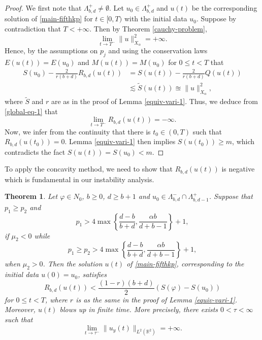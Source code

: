 \documentclass[10pt]{article}
\numberwithin{equation}{section}
\newtheorem{theorem}{\quad Theorem}[section]
\newcommand{\ff}{\varphi}
\newcommand{\x}{{X_\alpha}}
\newcommand{\moo}{\mu_2}  \newcommand{\poo}{{p_2}}
\newcommand{\al}{\alpha}
\newcommand{\rr}{\mathbb{R}}
\newcommand{\rrr}{{R_{b,d}}}
\begin{document}
	\begin{proof}
		We first note that $\Lambda_{b,d}^+\neq\emptyset$. Let $u_0\in \Lambda_{b,d}^+$ and $u(t)$ be the corresponding solution of \eqref{main-fifthkp} for $t\in[0,T)$ with the initial data $u_0$. Suppose by contradiction that $T<+\infty$. Then by Theorem \ref{cauchy-problem},
		\begin{equation}\label{global-eq-1}
			\lim_{t\to T^-}\|u\|_\x^2=+\infty.
		\end{equation}
		Hence, by the assumptions on $p_j$ and using the conservation laws $E(u(t))=E(u_0)$ and $M(u(t))=M(u_0)$ for $0\leq t<T$  that
		\[
		\begin{split}
			S(u_0)-\frac{2}{r(b+d)}\rrr(u(t))&=
			S(u(t))-\frac{2}{r(b+d)}Q(u(t))\\
			&\lesssim\tilde S(u(t))
			\approxeq\|u\|_{\x}^2,
		\end{split}\]
		where $\tilde S$ and $r$ are as in the proof of Lemma \ref{equiv-vari-1}.
		Thus,  we deduce from \eqref{global-eq-1} that
		\[
		\lim_{t\to T^-}\rrr(u(t))=-\infty.
		\]
		Now, we infer from the continuity that there is $t_0\in(0,T)$ such that $\rrr(u(t_0))=0$. Lemma \ref{equiv-vari-1} then implies $S(u(t_0))\geq m$, which contradicts the fact $S(u(t))=S(u_0)<m$.
	\end{proof}
	
	
	To apply the concavity method, we need to show that $R_{b,d}(u(t))$ is negative which is fundamental in our instability analysis.
	\begin{theorem}\label{thm-improved-blow-up}
		Let $\ff\in N_0$, $b\geq0$, $d\geq b+1$  and $u_0\in \Lambda_{b,d}^-\cap \Lambda_{b,d-1}^+$.	
		Suppose that  $p_1\geq p_2$ and
		\[
		p_1>4\max\left\{\frac{d-b}{b+d},\frac{\al b}{d+b-1}\right\}+1,
		\]
		if $\moo<0$ while
		\[
		p_1\geq p_2>4\max\left\{\frac{d-b}{b+d},\frac{\al b}{d+b-1}\right\}+1,
		\]
		when $\mu_2>0$.
		Then the solution $u(t)$ of \eqref{main-fifthkp},
		corresponding to the initial data $u(0) = u_0$,  satisfies  
		\begin{equation}\label{rho}
			\rrr(u(t))< 	\frac{(1-r)(b+d)}{2}(S(\ff)-S(u_0)) 
		\end{equation}
		for $0\leq t<T$, where $r$ is as the same in the proof of Lemma \ref{equiv-vari-1}.
		Moreover, $u(t)$ blows up in finite time. More precisely, there
		exists $0 < \tau <\infty$ such that
		\begin{equation}\label{eq-blup}
			\lim_{t\to\tau^-}\|u_y(t)\|_{L^2(\rr^2)}=+\infty.
		\end{equation}
		
	\end{theorem}
	
\end{document}
